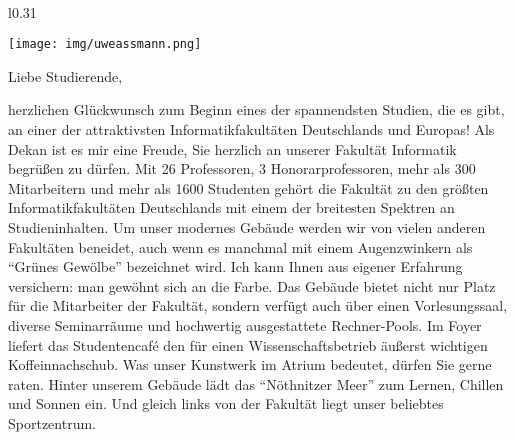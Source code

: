 \thispagestyle{empty}
\
\pagebreak


\begin{wrapfigure}{l}{0.31\textwidth}
  \vspace{-12pt}
  \begin{centering}
    \texttt{[image: img/uweassmann.png]}
  \end{centering}
  \vspace{-15pt}
\end{wrapfigure}

{\fontsize{10pt}{11}\selectfont

Liebe Studierende,

herzlichen Glückwunsch zum Beginn eines der spannendsten Studien, die es gibt, an  einer der attraktivsten Informatikfakultäten Deutschlands und Europas!  Als Dekan ist es mir eine Freude, Sie herzlich an unserer Fakultät  Informatik begrüßen zu dürfen. Mit 26 Professoren, 3 Honorarprofessoren, mehr als 300 Mitarbeitern und mehr als 1600 Studenten gehört die  Fakultät zu den größten Informatikfakultäten Deutschlands mit einem der  breitesten Spektren an Studieninhalten. Um unser modernes Gebäude werden wir von vielen anderen Fakultäten beneidet, auch wenn es manchmal mit  einem Augenzwinkern als \enquote{Grünes Gewölbe} bezeichnet wird. Ich  kann Ihnen aus eigener Erfahrung versichern: man gewöhnt sich an die  Farbe. Das Gebäude bietet nicht nur Platz für die Mitarbeiter der  Fakultät, sondern verfügt auch über einen Vorlesungssaal, diverse  Seminarräume und hochwertig ausgestattete Rechner-Pools. Im Foyer  liefert das Studentencafé \ascii{} den für einen Wissenschaftsbetrieb  äußerst wichtigen Koffeinnachschub. Was unser Kunstwerk im Atrium  bedeutet, dürfen Sie gerne raten. Hinter unserem Gebäude lädt das  \enquote{Nöthnitzer Meer} zum Lernen, Chillen und Sonnen ein. Und gleich links von der Fakultät liegt unser beliebtes Sportzentrum.

}
